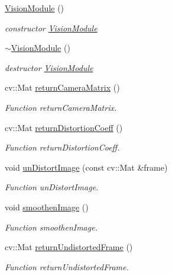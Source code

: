 \begin{DoxyCompactItemize}
\item 
\hyperlink{classVisionModule_a08440f0aeb474f1927b98e01953f47b0}{Vision\+Module} ()
\begin{DoxyCompactList}\small\item\em constructor \hyperlink{classVisionModule}{Vision\+Module} \end{DoxyCompactList}\item 
\hyperlink{classVisionModule_a820fbd8149b606d24135e2738beb50ec}{$\sim$\+Vision\+Module} ()
\begin{DoxyCompactList}\small\item\em destructor \hyperlink{classVisionModule}{Vision\+Module} \end{DoxyCompactList}\item 
cv\+::\+Mat \hyperlink{classVisionModule_a8f2c6222b903345f51dcd2915ad9b242}{return\+Camera\+Matrix} ()
\begin{DoxyCompactList}\small\item\em Function return\+Camera\+Matrix. \end{DoxyCompactList}\item 
cv\+::\+Mat \hyperlink{classVisionModule_a0139269bcadfeec6da4a67d8c23ebfed}{return\+Distortion\+Coeff} ()
\begin{DoxyCompactList}\small\item\em Function return\+Distortion\+Coeff. \end{DoxyCompactList}\item 
void \hyperlink{classVisionModule_a757a41b41c14a7589196db35ac406f55}{un\+Distort\+Image} (const cv\+::\+Mat \&frame)
\begin{DoxyCompactList}\small\item\em Function un\+Distort\+Image. \end{DoxyCompactList}\item 
void \hyperlink{classVisionModule_a1e405de689311b5c50f2a9e5e2e229a8}{smoothen\+Image} ()
\begin{DoxyCompactList}\small\item\em Function smoothen\+Image. \end{DoxyCompactList}\item 
cv\+::\+Mat \hyperlink{classVisionModule_a196e5fdf5247b2485a49ece512d45143}{return\+Undistorted\+Frame} ()
\begin{DoxyCompactList}\small\item\em Function return\+Undistorted\+Frame. \end{DoxyCompactList}\item 

\end{DoxyCompactItemize}
